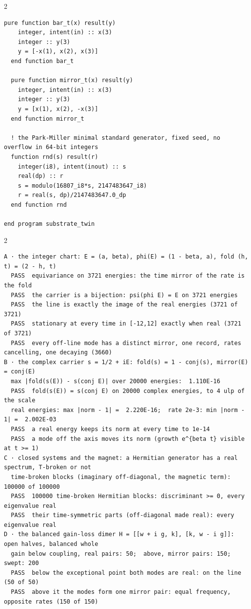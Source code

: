 \documentclass[10pt]{article}
\begin{document}
\begin{multicols}{2}
\begin{Verbatim}[fontsize=\fontsize{6.2}{7.2}\selectfont,breaklines,breakanywhere,breaksymbolleft={}]
  pure function bar_t(x) result(y)
    integer, intent(in) :: x(3)
    integer :: y(3)
    y = [-x(1), x(2), x(3)]
  end function bar_t

  pure function mirror_t(x) result(y)
    integer, intent(in) :: x(3)
    integer :: y(3)
    y = [x(1), x(2), -x(3)]
  end function mirror_t

  ! the Park-Miller minimal standard generator, fixed seed, no overflow in 64-bit integers
  function rnd(s) result(r)
    integer(i8), intent(inout) :: s
    real(dp) :: r
    s = modulo(16807_i8*s, 2147483647_i8)
    r = real(s, dp)/2147483647.0_dp
  end function rnd

end program substrate_twin
\end{Verbatim}
\end{multicols}

\begin{multicols}{2}
\begin{Verbatim}[fontsize=\fontsize{6.2}{7.2}\selectfont,breaklines,breakanywhere,breaksymbolleft={}]
A · the integer chart: E = (a, beta), phi(E) = (1 - beta, a), fold (h, t) = (2 - h, t)
  PASS  equivariance on 3721 energies: the time mirror of the rate is the fold
  PASS  the carrier is a bijection: psi(phi E) = E on 3721 energies
  PASS  the line is exactly the image of the real energies (3721 of 3721)
  PASS  stationary at every time in [-12,12] exactly when real (3721 of 3721)
  PASS  every off-line mode has a distinct mirror, one record, rates cancelling, one decaying (3660)
B · the complex carrier s = 1/2 + iE: fold(s) = 1 - conj(s), mirror(E) = conj(E)
  max |fold(s(E)) - s(conj E)| over 20000 energies:  1.110E-16
  PASS  fold(s(E)) = s(conj E) on 20000 complex energies, to 4 ulp of the scale
  real energies: max |norm - 1| =  2.220E-16;  rate 2e-3: min |norm - 1| =  2.002E-03
  PASS  a real energy keeps its norm at every time to 1e-14
  PASS  a mode off the axis moves its norm (growth e^{beta t} visible at t >= 1)
C · closed systems and the magnet: a Hermitian generator has a real spectrum, T-broken or not
  time-broken blocks (imaginary off-diagonal, the magnetic term): 100000 of 100000
  PASS  100000 time-broken Hermitian blocks: discriminant >= 0, every eigenvalue real
  PASS  their time-symmetric parts (off-diagonal made real): every eigenvalue real
D · the balanced gain-loss dimer H = [[w + i g, k], [k, w - i g]]: open halves, balanced whole
  gain below coupling, real pairs: 50;  above, mirror pairs: 150;  swept: 200
  PASS  below the exceptional point both modes are real: on the line (50 of 50)
  PASS  above it the modes form one mirror pair: equal frequency, opposite rates (150 of 150)

\end{Verbatim}
\end{multicols}
\end{document}
